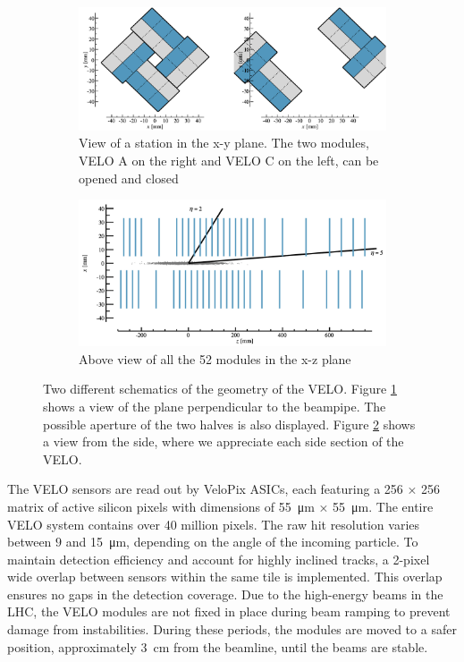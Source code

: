 \begin{figure}
    \centering
    \begin{subfigure}{0.48\textwidth}
    \includegraphics[width=\linewidth]{figures/aperture.png}
    \caption{View of a station in the x-y plane. The two modules, VELO A on the right and VELO C on the left, can be opened and closed}\label{fig_velo-xy}
    \end{subfigure}
    \begin{subfigure}{0.48\textwidth}
    \includegraphics[width=\linewidth]{figures/above_view.png}
    \caption{Above view of all the 52 modules in the x-z plane}\label{fig_velo-side}
    \end{subfigure}
    \caption{Two different schematics of the geometry of the VELO. Figure \ref{fig_velo-xy} shows a view of the plane perpendicular to the beampipe. The possible aperture of the two halves is also displayed. Figure \ref{fig_velo-side} shows a view from the side, where we appreciate each side section of the VELO.}
    \label{fig:velo-geometry}
\end{figure}

The VELO sensors are read out by VeloPix ASICs, each featuring a 256 × 256 matrix of active silicon pixels with dimensions of \SI{55}{\micro\meter} × \SI{55}{\micro\meter}. The entire VELO system contains over 40 million pixels. The raw hit resolution varies between $9$ and \SI{15}{\micro\meter}, depending on the angle of the incoming particle. To maintain detection efficiency and account for highly inclined tracks, a 2-pixel wide overlap between sensors within the same tile is implemented. This overlap ensures no gaps in the detection coverage.
Due to the high-energy beams in the LHC, the VELO modules are not fixed in place during beam ramping to prevent damage from instabilities. During these periods, the modules are moved to a safer position, approximately \SI{3}{\centi\meter} from the beamline, until the beams are stable.

